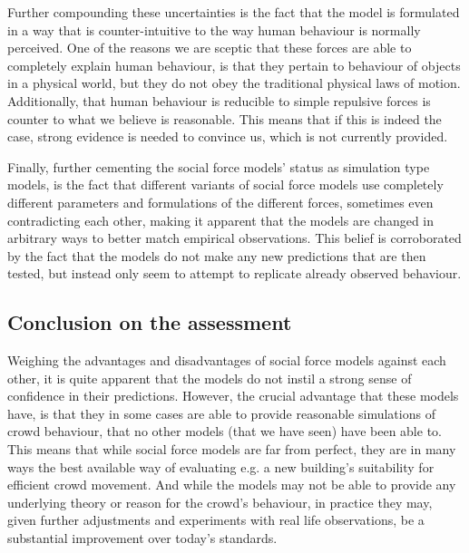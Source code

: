 Further compounding these uncertainties is the fact that the model is 
formulated in a way that is counter-intuitive to the way human behaviour is 
normally perceived. One of the reasons we are sceptic that these forces are 
able to completely explain human behaviour, is that they pertain to behaviour 
of objects in a physical world, but they do not obey the traditional physical 
laws of motion. Additionally, that human behaviour is reducible to simple 
repulsive forces is counter to what we believe is reasonable. This means that 
if this is indeed the case, strong evidence is needed to convince us, which is 
not currently provided.   

Finally, further cementing the social force models' status as simulation type 
models, is the fact that different variants of social force models use 
completely different parameters and formulations of the different forces, 
sometimes even contradicting each other, making it apparent that the models 
are changed in arbitrary ways to better match empirical observations. This 
belief is corroborated by the fact that the models do not make any new 
predictions that are then tested, but instead only seem to attempt to 
replicate already observed behaviour.

\subsection{Conclusion on the assessment}
Weighing the advantages and disadvantages of social force models against each 
other, it is quite apparent that the models do not instil a strong sense of 
confidence in their predictions. However, the crucial advantage that these 
models have, is that they in some cases are able to provide reasonable 
simulations of crowd behaviour, that no other models (that we have seen) have 
been able to. This means that while social force models are far from perfect, 
they are in many ways the best available way of evaluating e.g. a new 
building's suitability for efficient crowd movement. And while the models may 
not be able to provide any underlying theory or reason for the crowd's 
behaviour, in practice they may, given further adjustments and experiments 
with real life observations, be a substantial improvement over today's 
standards.

